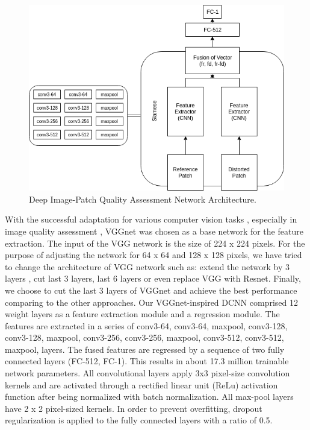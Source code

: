 \begin{figure}[H]
  \includegraphics[width=\linewidth]{figures/dipqa.png}
  \caption{Deep Image-Patch Quality Assessment Network Architecture.}
  \label{fig:dipqa-architecture}
\end{figure}

With the successful adaptation for various computer vision tasks \cite{Girshick2015, Shelhamer2017}, especially in image quality assessment \cite{Bosse2018}, VGGnet \cite{Simonyan2014} was chosen as a base network for the feature extraction. The input of the VGG network is the size of 224 x 224 pixels. For the purpose of adjusting the network for 64 x 64 and 128 x 128 pixels, we have tried to change the architecture of VGG network such as: extend the network by 3 layers \cite{Bosse2018}, cut last 3 layers, last 6 layers or even replace VGG with Resnet. Finally, we choose to cut the last 3 layers of VGGnet and achieve the best performance comparing to the other approaches. Our VGGnet-inspired DCNN comprised 12 weight layers as a feature extraction module and a regression module. The features are extracted in a series of conv3-64, conv3-64, maxpool, conv3-128, conv3-128, maxpool, conv3-256, conv3-256, maxpool, conv3-512, conv3-512, maxpool, layers. The fused features are regressed by a sequence of two fully connected layers (FC-512, FC-1). This results in about 17.3 million trainable network parameters. All convolutional layers apply 3x3 pixel-size convolution kernels and are activated through a rectified linear unit (ReLu) \cite{Nair2010} activation function after being normalized with batch normalization. All max-pool layers have 2 x 2 pixel-sized kernels. In order to prevent overfitting, dropout regularization \cite{Sutskever2014} is applied to the fully connected layers with a ratio of 0.5.  

